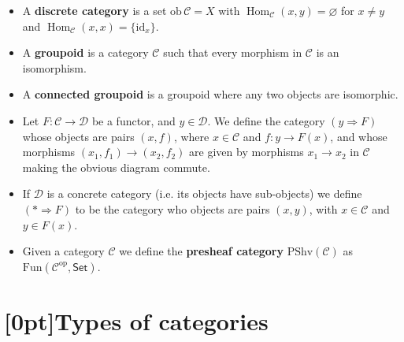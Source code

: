 \documentclass[10pt]{article}
\newcommand{\Set}{\mathsf{Set}}
\newcommand{\id}{\mathrm{id}}
\newcommand{\ccat}{\mathcal{C}}
\newcommand{\dcat}{\mathcal{D}}
\newcommand{\nt}{\Rightarrow}
\newcommand{\Fun}{\mathrm{Fun}}
\newcommand{\PShv}{\mathrm{PShv}}
\newcommand{\op}[1]{{#1}^\text{op}}
\DeclareMathOperator{\Hom}{Hom}
\newcommand{\CT}{\textcolor{orange}{CT}}
\begin{document}
        \begin{itemize}
            \item A \textbf{discrete category} is a set $\mathrm{ob}\,\ccat=X$ with $\Hom_\ccat(x,y)=\varnothing$ for $x\neq y$ and $\Hom_\ccat(x,x)=\{\id_x\}$.
            \item A \textbf{groupoid} is a category $\ccat$ such that every morphism in $\ccat$ is an isomorphism.
            \item A \textbf{connected groupoid} is a groupoid where any two objects are isomorphic.
            \item Let $F\colon\ccat\to\dcat$ be a functor, and $y\in\dcat$.
                We define the category $(y\nt F)$ whose objects are pairs $(x,f)$, where $x\in\ccat$ and $f\colon y\to F(x)$, and whose morphisms $(x_1,f_1)\to (x_2,f_2)$ are given by morphisms $x_1\to x_2$ in $\ccat$ making the obvious diagram commute.
            \item If $\dcat$ is a concrete category (i.e. its objects have sub-objects) we define $(*\nt F)$ to be the category who objects are pairs $(x,y)$, with $x\in\ccat$ and $y\in F(x)$.
            \item Given a category $\ccat$ we define the \textbf{presheaf category} $\PShv(\ccat)$ as $\Fun(\op{\ccat},\Set)$.
        \end{itemize}

    \section{\protect\marginnote{\CT}[0pt]Types of categories}
\end{document}
